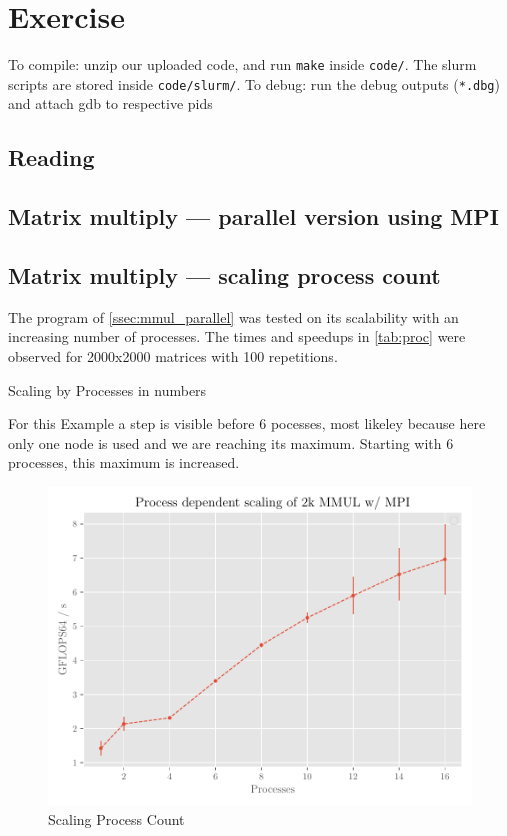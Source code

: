 \documentclass[]{scrartcl}
\newcommand{\exercise}{Exercise \thesection}
\begin{document}
\section*{\exercise}

To compile: unzip our uploaded code, and run \verb|make| inside \verb|code/|.
The slurm scripts are stored inside \verb|code/slurm/|.
To debug: run the debug outputs (\verb|*.dbg|) and attach gdb to respective pids

\subsection{Reading}
\subsection{Matrix multiply --- parallel version using MPI}\label{ssec:mmul_parallel}
\subsection{Matrix multiply --- scaling process count}\label{ssec:mmul_proc}

The program of \autoref{ssec:mmul_parallel} was tested on its scalability with an increasing number of processes.
The times and speedups in \autoref{tab:proc} were observed for 2000x2000 matrices with 100 repetitions.

\begin{table}[ht]
    \centering
    
    \caption{Scaling by Processes in numbers}\label{tab:proc}
\end{table}

For this Example a step is visible before 6 pocesses, most likeley because here only one node is used and we are reaching its maximum. Starting with 6 processes, this maximum is increased.

\begin{figure}[H]
    \centering
    \includegraphics[width=\linewidth]{img/scaling_proc.pdf}
    \caption{Scaling Process Count}%
    \label{fig:scaling_proc}
\end{figure}
\end{document}
